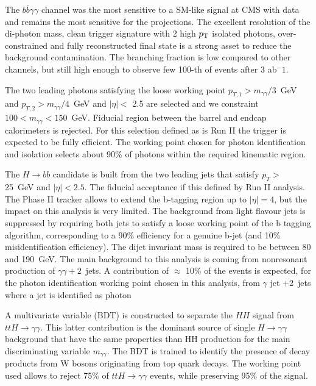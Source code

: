 The $b\bar{b}\gamma\gamma$ channel was the most sensitive to a SM-like signal at CMS with data \cite{CMS_PAS_HIG_17-030} and remains the most sensitive for the projections. 
The excellent resolution of the di-photon mass, clean trigger signature with 2 high $p_{\rm T}$ isolated photons, over-constrained and fully reconstructed final state is a strong asset to reduce the background contamination. The branching fraction is low compared to other channels, but still high enough to observe few 100-th of events after 3 ab$^-1$.

The two leading photons satisfying the loose working point $p_{T,1} > m_{\gamma\gamma}/3$~GeV and $p_{T,2} > m_{\gamma\gamma}/4$~GeV and $|\eta| <$ 2.5 are selected 
and we constraint $ 100 < m_{\gamma\gamma} < 150$~GeV. Fiducial region between the barrel and endcap calorimeters is rejected. For this selection defined as is Run II \cite{???} the trigger is expected to be fully efficient.
The working point chosen for photon identification and isolation selects about 90\% of photons within the required kinematic region. 

The $H \rightarrow bb$ candidate is built from the two leading jets that satisfy $p_T >$ 25~GeV and $|\eta| < 2.5$. The fiducial acceptance if this defined by Run II analysis. The Phase II tracker allows to extend the b-tagging region up to $|\eta| = 4$, but the impact on this analysis is very limited.
The background from light flavour jets is suppressed by requiring both jets to satisfy a loose working point of the  b tagging algorithm, corresponding to a 90\% efficiency for a genuine b-jet (and 10\% misidentification efficiency). The dijet invariant mass is required to be between 80 and 190~GeV. 
The main background to this analysis is coming from nonresonant production of $\gamma\gamma + 2$~jets. A contribution of $\approx$ 10\% of the events is expected, for the photon identification working point chosen in this analysis, from 
$\gamma$ jet $+ 2$~jets where a jet is identified as photon 

A multivariate variable (BDT) is constructed to separate the $HH$ signal from $ttH \rightarrow \gamma\gamma$. This latter contribution is the dominant source of single $H \rightarrow \gamma\gamma$ background that have the same properties than HH production for the main discriminating variable $m_{\gamma\gamma}$. The BDT is trained to identify the presence of decay products from W bosons originating from top quark decays. The working point used allows to reject 75\% of $ttH \rightarrow \gamma\gamma$ events, while preserving 95\% of the signal.

